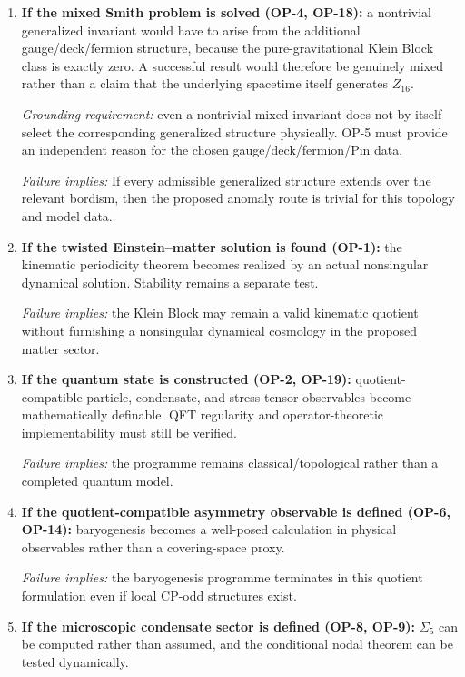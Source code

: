 \documentclass[11pt]{article}
\theoremstyle{canonmath}
\theoremstyle{canonpostulate}
\theoremstyle{canonclaim}
\def\mathbb#1{#1}%
\begin{document}
\begin{enumerate}
\item \textbf{If the mixed Smith problem is solved (OP-4, OP-18):} a nontrivial generalized invariant would have to arise from the additional gauge/deck/fermion structure, because the pure-gravitational Klein Block class is exactly zero. A successful result would therefore be genuinely mixed rather than a claim that the underlying spacetime itself generates $\mathbb Z_{16}$.

\emph{Grounding requirement:} even a nontrivial mixed invariant does not by itself select the corresponding generalized structure physically. OP-5 must provide an independent reason for the chosen gauge/deck/fermion/Pin data.

\emph{Failure implies:} If every admissible generalized structure extends over the relevant bordism, then the proposed anomaly route is trivial for this topology and model data.

\item \textbf{If the twisted Einstein--matter solution is found (OP-1):} the kinematic periodicity theorem becomes realized by an actual nonsingular dynamical solution. Stability remains a separate test.

\emph{Failure implies:} the Klein Block may remain a valid kinematic quotient without furnishing a nonsingular dynamical cosmology in the proposed matter sector.

\item \textbf{If the quantum state is constructed (OP-2, OP-19):} quotient-compatible particle, condensate, and stress-tensor observables become mathematically definable. QFT regularity and operator-theoretic implementability must still be verified.

\emph{Failure implies:} the programme remains classical/topological rather than a completed quantum model.

\item \textbf{If the quotient-compatible asymmetry observable is defined (OP-6, OP-14):} baryogenesis becomes a well-posed calculation in physical observables rather than a covering-space proxy.

\emph{Failure implies:} the baryogenesis programme terminates in this quotient formulation even if local CP-odd structures exist.

\item \textbf{If the microscopic condensate sector is defined (OP-8, OP-9):} $\Sigma_5$ can be computed rather than assumed, and the conditional nodal theorem can be tested dynamically.


\end{enumerate}
\end{document}
